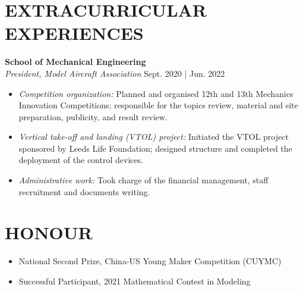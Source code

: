 \documentclass[a4paper,9pt]{extarticle}
\begin{document}
\section*{EXTRACURRICULAR EXPERIENCES}
\noindent
\textbf{School of Mechanical Engineering} \\ %
\textit{President, Model Aircraft Association} \hfill Sept. 2020 | Jun. 2022 %
\begin{itemize}
    \item \textit{Competition organization:} Planned and organised 12th and 13th Mechanics Innovation Competitions; responsible for the topics review, material and site preparation, publicity, and result review.
    \item \textit{Vertical take-off and landing (VTOL) project:} Initiated the VTOL project sponsored by Leeds Life Foundation; designed structure and completed the deployment of the control devices.
    \item \textit{Administrative work:} Took charge of the financial management, staff recruitment and documents writing.
\end{itemize}

\section*{HONOUR}
\begin{itemize}
    \item National Second Prize, China-US Young Maker Competition (CUYMC)
    \item Successful Participant, 2021 Mathematical Contest in Modeling
\end{itemize}

\end{document}
